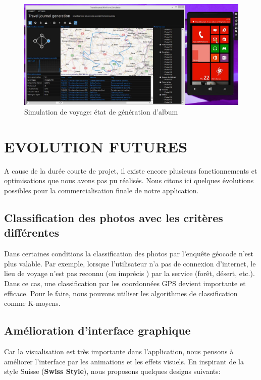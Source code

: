 \documentclass{article}
\begin{document}
\begin{figure}[h!]
\centering
\includegraphics[width=150mm]{SIMU3.jpg}
\caption{Simulation de voyage: état de génération d'album}
\end{figure}

\newpage
\section{\LARGE EVOLUTION FUTURES }

A cause de la durée courte de projet, il existe encore plusieurs fonctionnements et optimisations que nous avons pas pu réalisés. Nous citons ici quelques évolutions possibles pour la commercialisation finale de notre application.
 
\vspace{0.2 cm}
\subsection{\Large Classification des photos avec les critères différentes}
Dans certaines conditions la classification des photos par l'enquête géocode n'est plus valable. Par exemple, lorsque l'utilisateur n'a pas de connexion d'internet, le lieu de voyage n'est pas reconnu (ou imprécis ) par la service (forêt, désert, etc.). Dans ce cas, une classification par les coordonnées GPS devient importante et efficace. Pour le faire, nous pouvons utiliser les algorithmes de classification comme K-moyens.

\vspace{0.2 cm}
\subsection{\Large Amélioration d'interface graphique}
Car la visualisation est très importante dans l'application, nous pensons à améliorer l'interface par les animations et les effets visuels. En inspirant de la style Suisse (\textbf{Swiss Style}), nous proposons quelques designs suivants:
   
\end{document}
